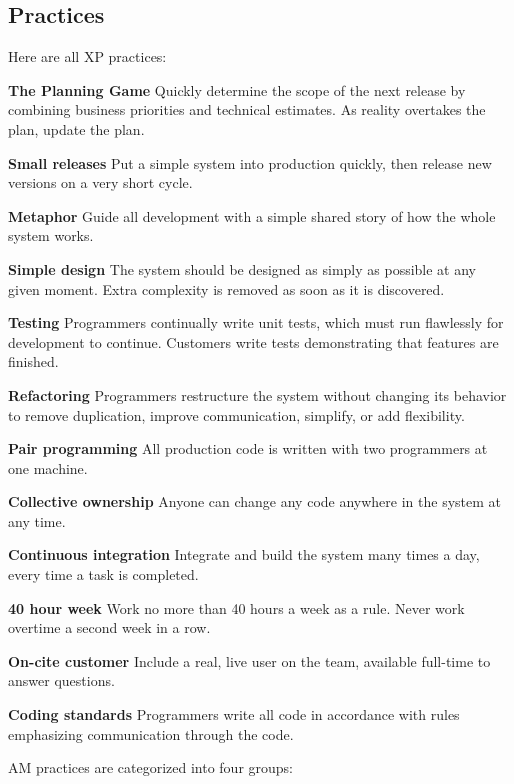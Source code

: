 \subsection{Practices}
Here are all XP practices:
\begin{description}
  \item {\bf The Planning Game} Quickly determine the scope of the next  
  release by combining business priorities and technical estimates. As reality
  overtakes the plan, update the plan.
  \item {\bf Small releases} Put a simple system into production quickly, then
  release new versions on a very short cycle.
  \item {\bf Metaphor} Guide all development with a simple shared story of how
  the whole system works.
  \item {\bf Simple design} The system should be designed as simply as possible
  at any given moment. Extra complexity is removed as soon as it is discovered.
  \item {\bf Testing} Programmers continually write unit tests, which must run
  flawlessly for development to continue. Customers write tests demonstrating
  that features are finished.
  \item {\bf Refactoring} Programmers restructure the system without changing
  its behavior to remove duplication, improve communication, simplify, or add
flexibility.
  \item {\bf Pair programming} All production code is written with two
  programmers at one machine.
  \item {\bf Collective ownership} Anyone can change any code anywhere in the
  system at any time.
  \item {\bf Continuous integration} Integrate and build the system many times
  a day, every time a task is completed.
  \item {\bf 40 hour week} Work no more than 40 hours a week as a rule. Never
  work overtime a second week in a row.
  \item {\bf On-cite customer} Include a real, live user on the team, available
  full-time to answer questions.
  \item {\bf Coding standards} Programmers write all code in accordance with
  rules emphasizing communication through the code.\cite{BeckAndres200411}
\end{description}
AM practices are categorized into four groups:
